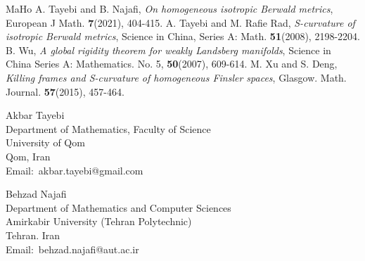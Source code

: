 \documentclass[12pt,a4paper]{article}
\theoremstyle{definition}
\numberwithin{equation}{section}
\begin{document}
\begin{thebibliography}{MaHo}
 A. Tayebi and B. Najafi, {\it On homogeneous isotropic Berwald metrics},  European J Math. {\bf 7}(2021), 404-415.
 A. Tayebi and M. Rafie Rad, {\it  S-curvature of isotropic Berwald metrics}, Science in China, Series A: Math. {\bf 51}(2008), 2198-2204.
 B. Wu, {\it A global rigidity theorem for weakly Landsberg manifolds}, Science in China Series A: Mathematics. No. 5, {\bf 50}(2007), 609-614.
 M. Xu and S. Deng, {\it Killing frames and S-curvature of homogeneous Finsler spaces}, Glasgow. Math. Journal. {\bf 57}(2015), 457-464.

\end{thebibliography}

\bigskip

\noindent
Akbar Tayebi\\
Department of Mathematics, Faculty  of Science\\
University of Qom \\
Qom, Iran\\
Email:\ akbar.tayebi@gmail.com

\bigskip

\noindent
Behzad Najafi\\
Department of Mathematics and Computer Sciences\\
Amirkabir University (Tehran Polytechnic)\\
Tehran. Iran\\
Email:\ behzad.najafi@aut.ac.ir
\end{document}
